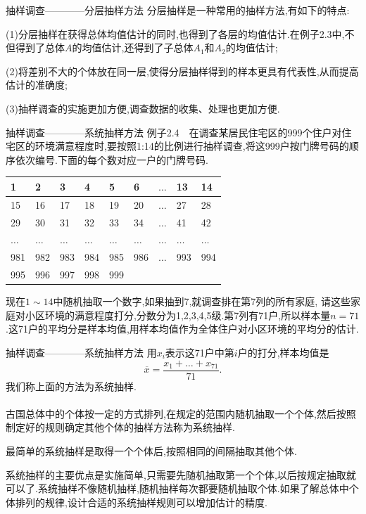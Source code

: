 \begin{frame}{抽样调查————分层抽样方法}
分层抽样是一种常用的抽样方法,有如下的特点:

(1)分层抽样在获得总体均值估计的同时,也得到了各层的均值估计.在例子2.3中,不但得到了总体$A$的均值估计,还得到了子总体$A_1$和$A_2$的均值估计;

(2)将差别不大的个体放在同一层,使得分层抽样得到的样本更具有代表性,从而提高估计的准确度;

(3)抽样调查的实施更加方便,调查数据的收集、处理也更加方便.
\end{frame}

\begin{frame}{抽样调查————系统抽样方法}
例子2.4$\quad$在调查某居民住宅区的999个住户对住宅区的环境满意程度时,要按照1:14的比例进行抽样调查,将这999户按门牌号码的顺序依次编号.下面的每个数对应一户的门牌号码.
\begin{tabular}{l|l|l|l|l|l|l|l|l}
\hline 1 & 2 & 3 & 4 & 5 & 6 & $\dots$ & 13 & 14\\
\hline 15 & 16 & 17 & 18 & 19 & 20 & $\dots$ & 27 & 28\\
\hline 29 & 30 & 31 & 32 & 33 & 34 & $\dots$ & 41 & 42\\
\hline $\dots$ & $\dots$ &$\dots$ &$\dots$ &$\dots$ &$\dots$ &$\dots$ &$\dots$& $\dots$  \\
\hline 981 & 982 & 983 & 984 & 985 & 986 & $\dots$ & 993 & 994\\
\hline 995 & 996 & 997 & 998 & 999\\
\hline
\end{tabular}

现在$1\sim 14$中随机抽取一个数字,如果抽到7,就调查排在第7列的所有家庭,
请这些家庭对小区环境的满意程度打分,分数分为1,2,3,4,5级.第7列有71户,所以样本量$n =71$.这71户的平均分是样本均值,用样本均值作为全体住户对小区环境的平均分的估计.

\end{frame}

\begin{frame}{抽样调查————系统抽样方法}
用$x_i$表示这71户中第$i$户的打分,样本均值是
\begin{equation*}
\overline{x} = \frac{x_1+\dots+x_{71}}{71}.
\end{equation*}
我们称上面的方法为系统抽样.
\\ \hspace*{\fill} \\
古国总体中的个体按一定的方式排列,在规定的范围内随机抽取一个个体,然后按照制定好的规则确定其他个体的抽样方法称为\alert{系统抽样}.

最简单的系统抽样是取得一个个体后,按照相同的间隔抽取其他个体.

系统抽样的主要优点是实施简单,只需要先随机抽取第一个个体,以后按规定抽取就可以了.系统抽样不像随机抽样,随机抽样每次都要随机抽取个体.如果了解总体中个体排列的规律,设计合适的系统抽样规则可以增加估计的精度.
\end{frame}

